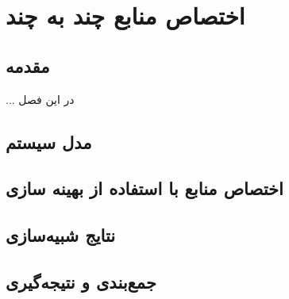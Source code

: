 \chapter{اختصاص منابع  چند به چند}\label{Chap:many_to_many_allocation}
  \thispagestyle{empty}
  \section{مقدمه}
    ...
    در این فصل
  \section{مدل سیستم}
  \section{اختصاص منابع با استفاده از بهینه سازی}
  \section{نتایج شبیه‌سازی}
  \section{جمع‌بندی و نتیجه‌گیری}
    